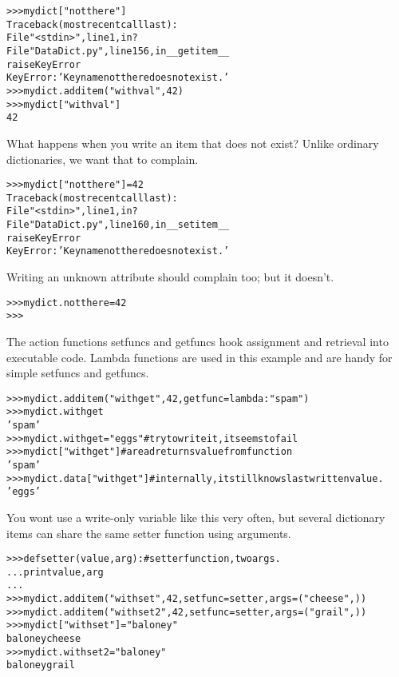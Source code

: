 \begin{alltt}
{\textgreater}{\textgreater}{\textgreater} mydict["notthere"]
Traceback (most recent call last):
  File "{\textless}stdin{\textgreater}", line 1, in ?
  File "DataDict.py", line 156, in \_\_getitem\_\_
    raise KeyError
KeyError: 'Key name notthere does not exist.'
{\textgreater}{\textgreater}{\textgreater} mydict.additem("withval",42)
{\textgreater}{\textgreater}{\textgreater} mydict["withval"]
42\end{alltt}

What happens when you write an item that does not exist? Unlike ordinary 
dictionaries, we want that to complain.

\begin{alltt}
{\textgreater}{\textgreater}{\textgreater} mydict["notthere"] = 42
Traceback (most recent call last):
  File "{\textless}stdin{\textgreater}", line 1, in ?
  File "DataDict.py", line 160, in \_\_setitem\_\_
    raise KeyError
KeyError: 'Key name notthere does not exist.'\end{alltt}

Writing an unknown attribute should complain too; but it doesn't.

\begin{alltt}
{\textgreater}{\textgreater}{\textgreater} mydict.notthere = 42 
{\textgreater}{\textgreater}{\textgreater} \end{alltt}

The action functions setfuncs and getfuncs hook assignment and retrieval 
into executable code. Lambda functions are used in this example and  are 
handy for simple setfuncs and getfuncs.

\begin{alltt}
{\textgreater}{\textgreater}{\textgreater} mydict.additem("withget",42,getfunc = lambda : "spam")
{\textgreater}{\textgreater}{\textgreater} mydict.withget
'spam'
{\textgreater}{\textgreater}{\textgreater} mydict.withget = "eggs" \# try to write it, it seems to fail
{\textgreater}{\textgreater}{\textgreater} mydict["withget"] \# a read returns value from function
'spam'
{\textgreater}{\textgreater}{\textgreater} mydict.data["withget"] \# internally, it still knows last written value.
'eggs'\end{alltt}

You wont use a write-only variable like this very often, but several 
dictionary items can share the same setter function using arguments.

\begin{alltt}
{\textgreater}{\textgreater}{\textgreater} def setter(value, arg) : \# setter function, two args.
...     print value, arg
...
{\textgreater}{\textgreater}{\textgreater} mydict.additem("withset",42,setfunc = setter, args = ("cheese",))
{\textgreater}{\textgreater}{\textgreater} mydict.additem("withset2",42,setfunc = setter, args = ("grail",))
{\textgreater}{\textgreater}{\textgreater} mydict["withset"]  = "baloney"
baloney cheese
{\textgreater}{\textgreater}{\textgreater} mydict.withset2  = "baloney"
baloney grail\end{alltt}

